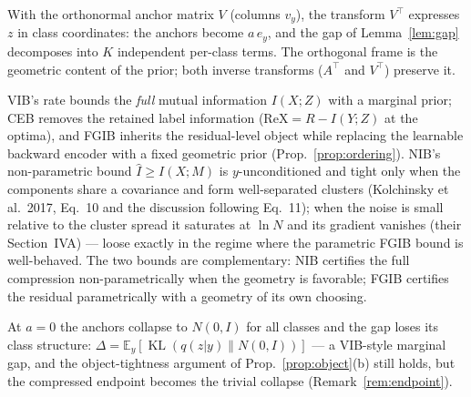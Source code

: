 \begin{remark}\label{rem:frame}
With the orthonormal anchor matrix $V$ (columns $v_y$), the transform $V^{\top}$
expresses $z$ in class coordinates: the anchors become $a\,e_y$, and the gap of
Lemma~\ref{lem:gap} decomposes into $K$ independent per-class terms. The orthogonal
frame is the geometric content of the prior; both inverse transforms ($A^{\top}$ and
$V^{\top}$) preserve it.
\end{remark}

\begin{remark}\label{rem:position}
VIB's rate bounds the \emph{full} mutual information $I(X;Z)$ with a marginal prior;
CEB removes the retained label information ($\mathrm{ReX} = R - I(Y;Z)$ at the optima),
and FGIB inherits the residual-level object while replacing the learnable backward
encoder with a fixed geometric prior (Prop.~\ref{prop:ordering}).
NIB's non-parametric bound $\widehat I \ge I(X;M)$ is $y$-unconditioned and tight only
when the components share a covariance and form well-separated clusters (Kolchinsky et
al.\ 2017, Eq.~10 and the discussion following Eq.~11); when the noise is small relative
to the cluster spread it saturates at $\ln N$ and its gradient vanishes (their
Section~IVA) --- loose exactly in the regime where the parametric FGIB bound is
well-behaved. The two bounds are complementary: NIB certifies the full compression
non-parametrically when the geometry is favorable; FGIB certifies the residual
parametrically with a geometry of its own choosing.
\end{remark}

\begin{remark}\label{rem:a0}
At $a = 0$ the anchors collapse to $N(0, I)$ for all classes and the gap loses its class
structure: $\Delta = \mathbb{E}_y[\operatorname{KL}(q(z|y)\|N(0,I))]$ --- a VIB-style
marginal gap, and the object-tightness argument of
Prop.~\ref{prop:object}(b) still holds, but the compressed endpoint becomes the trivial
collapse (Remark~\ref{rem:endpoint}).
\end{remark}

